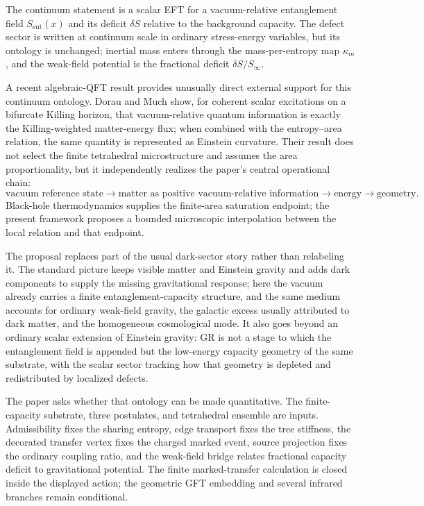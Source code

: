 \documentclass[11pt]{article}
\begin{document}
The continuum statement is a scalar EFT for a vacuum-relative entanglement field $S_{\mathrm{ent}}(x)$ and its deficit $\delta S$ relative to the background capacity. The defect sector is written at continuum scale in ordinary stress-energy variables, but its ontology is unchanged; inertial mass enters through the mass-per-entropy map $\kappa_m$, and the weak-field potential is the fractional deficit $\delta S/S_\infty$.

A recent algebraic-QFT result provides unusually direct external support for this continuum ontology. Dorau and Much \citep{DorauMuch2026} show, for coherent scalar excitations on a bifurcate Killing horizon, that vacuum-relative quantum information is exactly the Killing-weighted matter-energy flux; when combined with the entropy--area relation, the same quantity is represented as Einstein curvature. Their result does not select the finite tetrahedral microstructure and assumes the area proportionality, but it independently realizes the paper's central operational chain:
\[
\text{vacuum reference state}
\longrightarrow
\text{matter as positive vacuum-relative information}
\longrightarrow
\text{energy}
\longrightarrow
\text{geometry}.
\] Black-hole thermodynamics supplies the finite-area saturation endpoint; the present framework proposes a bounded microscopic interpolation between the local relation and that endpoint.

The proposal replaces part of the usual dark-sector story rather than relabeling it. The standard picture keeps visible matter and Einstein gravity and adds dark components to supply the missing gravitational response; here the vacuum already carries a finite entanglement-capacity structure, and the same medium accounts for ordinary weak-field gravity, the galactic excess usually attributed to dark matter, and the homogeneous cosmological mode. It also goes beyond an ordinary scalar extension of Einstein gravity: GR is not a stage to which the entanglement field is appended but the low-energy capacity geometry of the same substrate, with the scalar sector tracking how that geometry is depleted and redistributed by localized defects.

The paper asks whether that ontology can be made quantitative. The finite-capacity substrate, three postulates, and tetrahedral ensemble are inputs. Admissibility fixes the sharing entropy, edge transport fixes the tree stiffness, the decorated transfer vertex fixes the charged marked event, source projection fixes the ordinary coupling ratio, and the weak-field bridge relates fractional capacity deficit to gravitational potential. The finite marked-transfer calculation is closed inside the displayed action; the geometric GFT embedding and several infrared branches remain conditional.
\end{document}
